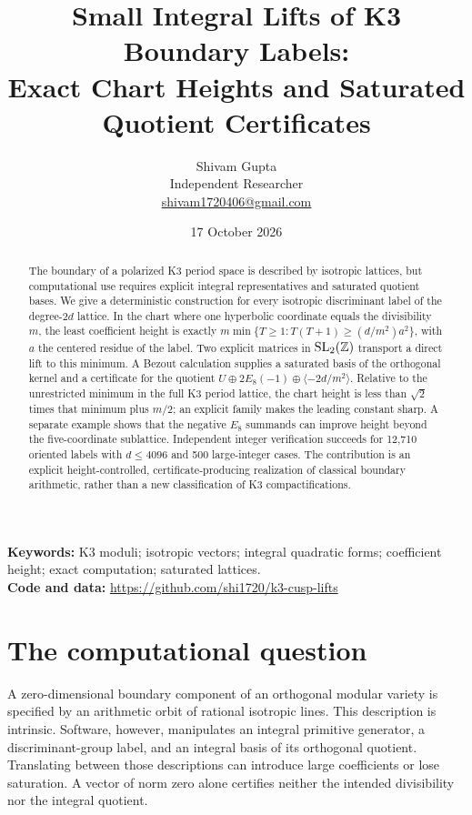 \documentclass[11pt]{article}
\title{Small Integral Lifts of K3 Boundary Labels:\\Exact Chart Heights and Saturated Quotient Certificates}
\author{Shivam Gupta\\\small Independent Researcher\\\small\href{mailto:shivam1720406@gmail.com}{shivam1720406@gmail.com}}
\date{17 October 2026}
\theoremstyle{remark}\newtheorem{remark}[theorem]{Remark}
\newcommand{\Z}{\mathbb Z}\newcommand{\Q}{\mathbb Q}\newcommand{\R}{\mathbb R}
\begin{document}
\maketitle
\begin{abstract}
The boundary of a polarized K3 period space is described by isotropic lattices, but computational use requires explicit integral representatives and saturated quotient bases. We give a deterministic construction for every isotropic discriminant label of the degree-$2d$ lattice. In the chart where one hyperbolic coordinate equals the divisibility $m$, the least coefficient height is exactly $m\min\{T\geq1:T(T+1)\geq (d/m^2)a^2\}$, with $a$ the centered residue of the label. Two explicit matrices in $\SL_2(\Z)$ transport a direct lift to this minimum. A Bezout calculation supplies a saturated basis of the orthogonal kernel and a certificate for the quotient $U\oplus2E_8(-1)\oplus\langle-2d/m^2\rangle$. Relative to the unrestricted minimum in the full K3 period lattice, the chart height is less than $\sqrt2$ times that minimum plus $m/2$; an explicit family makes the leading constant sharp. A separate example shows that the negative $E_8$ summands can improve height beyond the five-coordinate sublattice. Independent integer verification succeeds for 12,710 oriented labels with $d\leq4096$ and 500 large-integer cases. The contribution is an explicit height-controlled, certificate-producing realization of classical boundary arithmetic, rather than a new classification of K3 compactifications.
\end{abstract}
\noindent\textbf{Keywords:} K3 moduli; isotropic vectors; integral quadratic forms; coefficient height; exact computation; saturated lattices.\\
\textbf{Code and data:} \url{https://github.com/shi1720/k3-cusp-lifts}

\section{The computational question}
A zero-dimensional boundary component of an orthogonal modular variety is specified by an arithmetic orbit of rational isotropic lines. This description is intrinsic. Software, however, manipulates an integral primitive generator, a discriminant-group label, and an integral basis of its orthogonal quotient. Translating between those descriptions can introduce large coefficients or lose saturation. A vector of norm zero alone certifies neither the intended divisibility nor the integral quotient.
\end{document}
